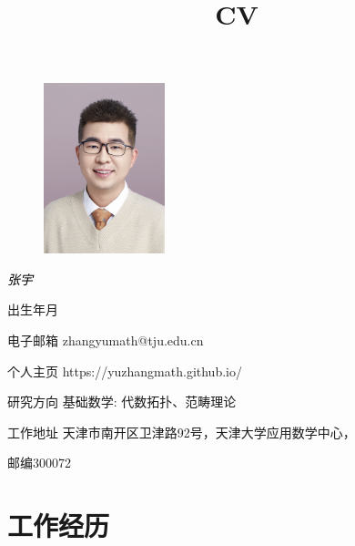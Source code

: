 \documentclass[12pt,a4paper,sans,fontset=windows]{moderncv} %
\title{CV}
\begin{document}
\begin{figure}
\centering
\includegraphics[width=100pt]{yu} 
\label{fig:wrapfig}
\end{figure}

\hspace{150pt}
\vspace{10pt}
\textit{\Huge{\textcolor{black}{张宇}}}

\vspace{10pt} 

出生年月 

\vspace{5pt} 

电子邮箱 \quad zhangyumath@tju.edu.cn

\vspace{5pt} 

个人主页 \quad https://yuzhangmath.github.io/

\vspace{5pt} 

研究方向 \quad 基础数学: 代数拓扑、范畴理论

\vspace{5pt} 

工作地址 \quad 天津市南开区卫津路92号，天津大学应用数学中心，

\vspace{2pt} 

\hspace{60pt} 邮编300072



\vspace{10pt} 

\section{工作经历}

\vspace{3pt} 

\end{document}
